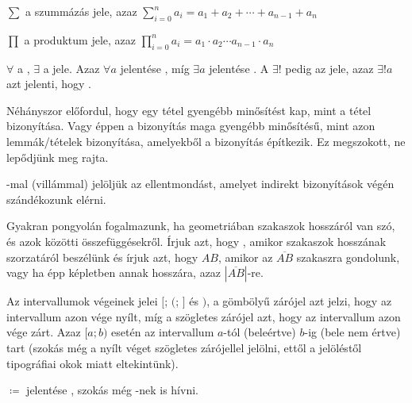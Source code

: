 $\sum$ a szummázás jele, azaz
  $\sum\limits_{i=0}^{n}a_i = a_1 + a_2 + \dotsb + a_{n-1} + a_n$

$\prod$ a produktum jele, azaz
  $\prod\limits_{i=0}^{n}a_i = a_1 \cdot a_2 \dotsm a_{n-1} \cdot a_n$

$\forall$ a , $\exists$ a  jele. Azaz
$\forall a$ jelentése , míg $\exists a$ jelentése
. A $\exists!$ pedig az  jele, azaz $\exists! a$ azt jelenti, hogy .

Néhányszor előfordul, hogy egy tétel gyengébb minősítést kap, mint a tétel
bizonyítása. Vagy éppen a bizonyítás maga gyengébb minősítésű, mint azon
lemmák/tételek bizonyítása, amelyekből a bizonyítás építkezik. Ez megszokott,
ne lepődjünk meg rajta.

\blitza-mal (villámmal) jelöljük az ellentmondást, amelyet indirekt
bizonyítások végén szándékozunk elérni.

Gyakran pongyolán fogalmazunk, ha geometriában szakaszok hosszáról van szó, és
azok közötti összefüggésekről. Írjuk azt, hogy ,
amikor szakaszok hosszának szorzatáról beszélünk és írjuk azt, hogy $AB$,
amikor az $\overline{AB}$ szakaszra gondolunk, vagy ha épp képletben annak
hosszára, azaz $|\overline{AB}|$-re.

Az intervallumok végeinek jelei $[$; $($; $]$ és $)$, a gömbölyű zárójel azt
jelzi, hogy az intervallum azon vége nyílt, míg a szögletes zárójel azt, hogy
az intervallum azon vége zárt. Azaz $[a; b)$ esetén az intervallum $a$-tól
(beleértve) $b$-ig (bele nem értve) tart (szokás még a nyílt véget
 szögletes zárójellel jelölni, ettől a jelöléstől
tipográfiai okok miatt eltekintünk).

$\coloneqq$ jelentése , szokás még -nek is hívni.
\cleardoublepage
